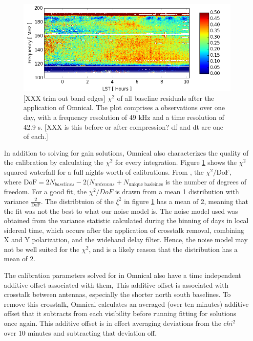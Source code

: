 \documentclass[twocolumn,numberedappendix]{emulateapj} \shorttitle{PSA64}
\begin{document}
\begin{figure}[!b]
\centering
\includegraphics[width=\columnwidth]{plots/chi2.png}
\caption{
[XXX trim out band edges]
$\chi^{2}$ of all baseline residuals after the application of Omnical.
The plot comprises a observations over one day, with a frequency resolution of
49 kHz and a time resolution of 42.9 s.
[XXX is this before or after compression?  df and dt are one of each.]
} \label{fig:chi2}
\end{figure}

In addition to solving for gain solutions, Omnical also characterizes the
quality of the calibration by calculating the $\chi^{2}$ for every integration.
Figure \ref{fig:chi2} shows the $\chi^{2}$ squared waterfall for a full nights
worth of calibrations. From \cite{zheng_et_al2014}, the $\chi^{2}/\text{DoF}$,
where $\text{DoF} = 2N_{baselines} - 2(N_{antennas} + N_{\text{unique
basleines}} $ is the number of degrees of freedom. For a good fit, the
$\chi^{2}/DoF$ is drawn from a mean 1 distribution with variance
$\frac{2}{\text{DoF}}$. The distribtuion of the $\xi^{2}$ in figure
\ref{fig:chi2} has a mean of 2, meaning that the fit was not the best to what
our noise model is.  The noise model used was obtained from the variance
statistic calculated during the binning of days in local sidereal time, which
occurs after the application of crosstalk removal, combining X and Y
polarization, and the wideband delay filter. Hence, the noise model may not be
well suited for the $\chi^{2}$, and is a likely reason that the distribution
has a mean of 2.

The calibration parameters solved for in Omnical also have a time independent
additive offset associated with them, This additive offset is associated with
crosstalk between antennas, especially the shorter north south baselines.
To remove this crosstalk, Omnical calculates an averaged (over ten minutes)
additive offset that it subtracts from each visibility before running fitting
for solutions once again. This additive offset is in effect averaging deviations
from the $chi^{2}$ over 10 minutes and subtracting that deviation off.
\end{document}
